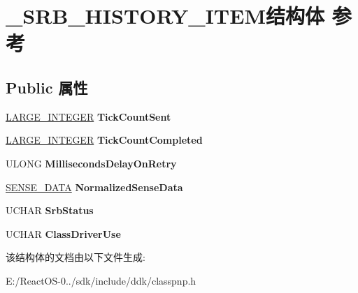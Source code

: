 \hypertarget{struct___s_r_b___h_i_s_t_o_r_y___i_t_e_m}{}\section{\+\_\+\+S\+R\+B\+\_\+\+H\+I\+S\+T\+O\+R\+Y\+\_\+\+I\+T\+E\+M结构体 参考}
\label{struct___s_r_b___h_i_s_t_o_r_y___i_t_e_m}
\subsection*{Public 属性}
\begin{DoxyCompactItemize}
\item 
\mbox{\label{struct___s_r_b___h_i_s_t_o_r_y___i_t_e_m_a7e920501b3056917b3051172e70725bd}} 
\hyperlink{union___l_a_r_g_e___i_n_t_e_g_e_r}{L\+A\+R\+G\+E\+\_\+\+I\+N\+T\+E\+G\+ER} {\bfseries Tick\+Count\+Sent}
\item 
\mbox{\label{struct___s_r_b___h_i_s_t_o_r_y___i_t_e_m_a8e44c26852300636950864fa89983616}} 
\hyperlink{union___l_a_r_g_e___i_n_t_e_g_e_r}{L\+A\+R\+G\+E\+\_\+\+I\+N\+T\+E\+G\+ER} {\bfseries Tick\+Count\+Completed}
\item 
\mbox{\label{struct___s_r_b___h_i_s_t_o_r_y___i_t_e_m_a985ed4851e23e9ad13d43591e4a8e273}} 
U\+L\+O\+NG {\bfseries Milliseconds\+Delay\+On\+Retry}
\item 
\mbox{\label{struct___s_r_b___h_i_s_t_o_r_y___i_t_e_m_afd33a87971d99f28aedf97843b20d314}} 
\hyperlink{struct___s_e_n_s_e___d_a_t_a}{S\+E\+N\+S\+E\+\_\+\+D\+A\+TA} {\bfseries Normalized\+Sense\+Data}
\item 
\mbox{\label{struct___s_r_b___h_i_s_t_o_r_y___i_t_e_m_ab3584e5f9e9270108725743ae6e6f978}} 
U\+C\+H\+AR {\bfseries Srb\+Status}
\item 
\mbox{\label{struct___s_r_b___h_i_s_t_o_r_y___i_t_e_m_a95762295071abdf360790d04aed14ee6}} 
U\+C\+H\+AR {\bfseries Class\+Driver\+Use}
\end{DoxyCompactItemize}


该结构体的文档由以下文件生成\+:\begin{DoxyCompactItemize}
\item 
E\+:/\+React\+O\+S-\/0../sdk/include/ddk/classpnp.\+h\end{DoxyCompactItemize}
